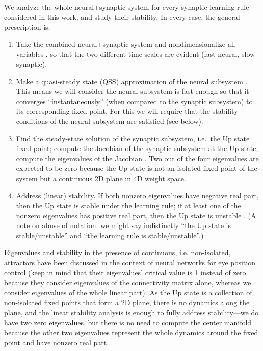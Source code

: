 \documentclass[twocolumn]{article}
\begin{document}
We analyze the whole neural+synaptic system for every synaptic learning rule considered in this work, and study their stability. In every case, the general prescription is:
\begin{enumerate}
\item Take the combined neural+synaptic system and nondimensionalize all variables \cite[see Sections 1.2 and 1.4 of Ref.\ ][]{Keener1998}\cite[see Section 3.5 of Ref.\ ][]{Strogatz2018}, so that the two different time scales are evident (fast neural, slow synaptic).
\item Make a quasi-steady state (QSS) approximation of the neural subsystem \cite{Keener1998,Strogatz2018}. This means we will consider the neural subsystem is fast enough so that it converges ``instantaneously'' (when compared to the synaptic subsystem) to its corresponding fixed point. 
For this we will require that the stability conditions of the neural subsystem are satisfied (see below).
\item Find the steady-state solution of the synaptic subsystem, i.e.\ the Up state fixed point; compute the Jacobian of the synaptic subsystem at the Up state; compute the eigenvalues of the Jacobian \cite{Strogatz2018,Wiggins1996}. Two out of the four eigenvalues are expected to be zero because the Up state is not an isolated fixed point of the system but a continuous 2D plane in 4D weight space.
\item Address (linear) stability. If both nonzero eigenvalues have negative real part, then the Up state is stable under the learning rule; if at least one of the nonzero eigenvalues has positive real part, then the Up state is unstable \cite{Strogatz2018,Wiggins1996}. (A note on abuse of notation: we might say indistinctly ``the Up state is stable/unstable'' and ``the learning rule is stable/unstable''.)
\end{enumerate}

Eigenvalues and stability in the presence of continuous, i.e. non-isolated, attractors have been discussed in the context of neural networks for eye position control \cite{Seung1996,Seung1998} (keep in mind that their eigenvalues' critical value is 1 instead of zero because they consider eigenvalues of the connectivity matrix alone, whereas we consider eigenvalues of the whole linear part). As the Up state is a collection of non-isolated fixed points that form a 2D plane, there is no dynamics along the plane, and the linear stability analysis is enough to fully address stability---we do have two zero eigenvalues, but there is no need to compute the center manifold \cite{Wiggins1996} because the other two eigenvalues represent the whole dynamics around the fixed point and have nonzero real part.
\end{document}
